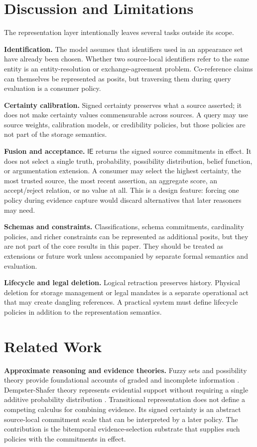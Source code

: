 \documentclass[a4paper,fleqn]{cas-sc}
\newcommand{\ie}{\mathsf{IE}}
\theoremstyle{plain}
\theoremstyle{remark}
\begin{document}
\section{Discussion and Limitations}
\label{Sec:discussion}
The representation layer intentionally leaves several tasks outside its scope.

\textbf{Identification.}
The model assumes that identifiers used in an appearance set have already been chosen. Whether two source-local identifiers refer to the same entity is an entity-resolution or exchange-agreement problem. Co-reference claims can themselves be represented as posits, but traversing them during query evaluation is a consumer policy.

\textbf{Certainty calibration.}
Signed certainty preserves what a source asserted; it does not make certainty values commensurable across sources. A query may use source weights, calibration models, or credibility policies, but those policies are not part of the storage semantics.

\textbf{Fusion and acceptance.}
\(\ie\) returns the signed source commitments in effect. It does not select a single truth, probability, possibility distribution, belief function, or argumentation extension. A consumer may select the highest certainty, the most trusted source, the most recent assertion, an aggregate score, an accept/reject relation, or no value at all. This is a design feature: forcing one policy during evidence capture would discard alternatives that later reasoners may need.

\textbf{Schemas and constraints.}
Classifications, schema commitments, cardinality policies, and richer constraints can be represented as additional posits, but they are not part of the core results in this paper. They should be treated as extensions or future work unless accompanied by separate formal semantics and evaluation.

\textbf{Lifecycle and legal deletion.}
Logical retraction preserves history. Physical deletion for storage management or legal mandates is a separate operational act that may create dangling references. A practical system must define lifecycle policies in addition to the representation semantics.

\section{Related Work}
\label{Sec:related}
\textbf{Approximate reasoning and evidence theories.}
Fuzzy sets and possibility theory provide foundational accounts of graded and incomplete information \cite{Zadeh1965,DuboisPrade1988}. Dempster-Shafer theory represents evidential support without requiring a single additive probability distribution \cite{Dempster1967,Shafer1976}. Transitional representation does not define a competing calculus for combining evidence. Its signed certainty is an abstract source-local commitment scale that can be interpreted by a later policy. The contribution is the bitemporal evidence-selection substrate that supplies such policies with the commitments in effect.
\end{document}
